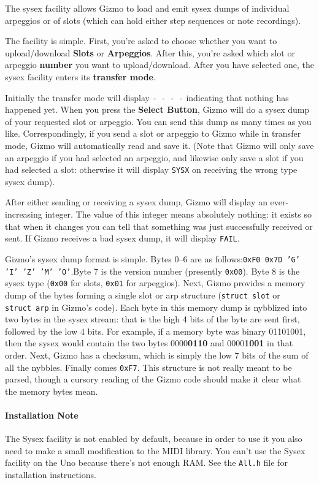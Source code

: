 \documentclass{article}
\begin{document}
	The sysex facility allows Gizmo to load and emit sysex dumps of individual arpeggios or of slots (which can hold either step sequences or note recordings).
	
	The facility is simple.  First, you're asked to choose whether you want to upload/download {\bf Slots} or {\bf Arpeggios}.  After this, you're asked which slot or arpeggio {\bf number} you want to upload/download.  After you have selected one, the sysex facility enters its {\bf transfer mode}.
	
Initially the transfer mode will display \texttt{-~-~-~-} indicating that nothing has happened yet.  When you press the {\bf Select Button}, Gizmo will do a sysex dump of your requested slot or arpeggio.  You can send this dump as many times as you like.  Correspondingly, if you send a slot or arpeggio to Gizmo while in transfer mode, Gizmo will automatically read and save it.  (Note that Gizmo will only save an arpeggio if you had selected an arpeggio, and likewise only save a slot if you had selected a slot: otherwise it will display \texttt{SYSX} on receiving the wrong type sysex dump).

After either sending or receiving a sysex dump, Gizmo will display an ever-increasing integer.  The value of this integer means absolutely nothing: it exists so that when it changes you can tell that something was just successfully received or sent.  If Gizmo receives a bad sysex dump, it will display \texttt{FAIL}.

Gizmo's sysex dump format is simple.  Bytes 0--6 are as follows:\quad\texttt{0xF0 0x7D 'G' 'I' 'Z' 'M' 'O'}.\quad  Byte 7 is the version number (presently \texttt{0x00}). Byte 8 is the sysex type (\texttt{0x00} for slots, \texttt{0x01} for arpeggios).  Next, Gizmo provides a memory dump of the bytes forming a single slot or arp structure (\texttt{struct~{\textunderscore}slot} or \texttt{struct~{\textunderscore}arp} in Gizmo's code).  Each byte in this memory dump is nybblized into two bytes in the sysex stream: that is the high 4 bits of the byte are sent first, followed by the low 4 bits.  For example, if a memory byte was binary 01101001, then the sysex would contain the two bytes 0000{\bf 0110} and 0000{\bf 1001} in that order.  Next, Gizmo has a checksum, which is simply the low 7 bits of the sum of all the nybbles.  Finally comes \texttt{0xF7}.   This structure is not really meant to be parsed, though a cursory reading of the Gizmo code should make it clear what the memory bytes mean.

\paragraph{Installation Note} The Sysex facility is not enabled by default, because in order to use it you also need to make a small modification to the MIDI library.  You can't use the Sysex facility on the Uno because there's not enough RAM.  See the {\tt All.h} file for installation instructions.
\end{document}
